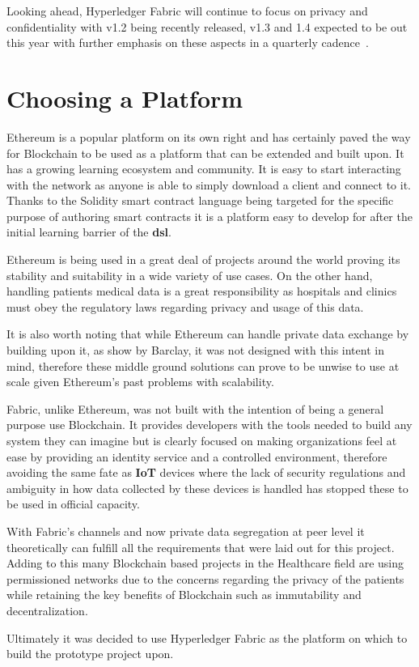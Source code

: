Looking ahead, Hyperledger Fabric will continue to focus on privacy and
confidentiality with v1.2 being recently released, v1.3 and 1.4 expected to be
out this year with further emphasis on these aspects in a quarterly
cadence~\cite{hyperledgerRoadmap2018}.

\section{Choosing a Platform}\label{choosePlatform}

Ethereum is a popular platform on its own right and has certainly paved the way
for Blockchain to be used as a platform that can be extended and built upon. It
has a growing learning ecosystem and community. It is easy to start interacting
with the network as anyone is able to simply download a client and connect to
it.  Thanks to the Solidity smart contract language being targeted for the
specific purpose of authoring smart contracts it is a platform easy to develop
for after the initial learning barrier of the \textbf{dsl}. 

Ethereum is being used in a great deal of projects around the world proving its
stability and suitability in a wide variety of use cases. On the other hand,
handling patients medical data is a great responsibility as hospitals and
clinics must obey the regulatory laws regarding privacy and usage of this data.

It is also worth noting that while Ethereum can handle private data exchange by
building upon it, as show by Barclay, it was not designed with this intent in
mind, therefore these middle ground solutions can prove to be unwise to use at
scale given Ethereum's past problems with scalability.

Fabric, unlike Ethereum, was not built with the intention of being a general
purpose use Blockchain. It provides developers with the tools needed to build
any system they can imagine but is clearly focused on making organizations feel
at ease by providing an identity service and a controlled environment,
therefore avoiding the same fate as \textbf{IoT} devices where the lack of
security regulations and ambiguity in how data collected by these devices is
handled has stopped these to be used in official capacity.

With Fabric's channels and now private data segregation at peer level it
theoretically can fulfill all the requirements that were laid out for this
project. Adding to this many Blockchain based projects in the Healthcare field
are using permissioned networks due to the concerns regarding the privacy of
the patients while retaining the key benefits of Blockchain such as
immutability and decentralization.

Ultimately it was decided to use Hyperledger Fabric as the platform on which to
build the prototype project upon.
